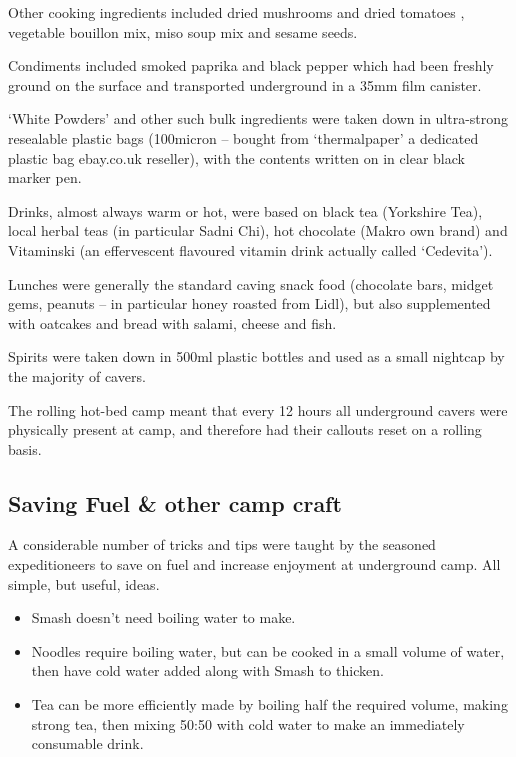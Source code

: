 Other cooking ingredients included dried mushrooms and dried tomatoes ,
vegetable bouillon mix, miso soup mix and sesame seeds.

Condiments included smoked paprika and black pepper which had been
freshly ground on the surface and transported underground in a 35mm film
canister.

`White Powders' and other such bulk ingredients were taken down in
ultra-strong resealable plastic bags (100micron -- bought from
`thermalpaper' a dedicated plastic bag ebay.co.uk reseller), with the
contents written on in clear black marker pen.

Drinks, almost always warm or hot, were based on black tea (Yorkshire
Tea), local herbal teas (in particular Sadni Chi), hot chocolate (Makro
own brand) and Vitaminski (an effervescent flavoured vitamin drink
actually called `Cedevita').

Lunches were generally the standard caving snack food (chocolate bars,
midget gems, peanuts -- in particular honey roasted from Lidl), but also
supplemented with oatcakes and bread with salami, cheese and fish.

Spirits were taken down in 500ml plastic bottles and used as a small
nightcap by the majority of cavers.

The rolling hot-bed camp meant that every 12 hours all underground
cavers were physically present at camp, and therefore had their callouts
reset on a rolling basis.

\hypertarget{saving-fuel-other-camp-craft}{%
\subsection{Saving Fuel \& other camp
craft}\label{saving-fuel-other-camp-craft}}

A considerable number of tricks and tips were taught by the seasoned
expeditioneers to save on fuel and increase enjoyment at underground
camp. All simple, but useful, ideas.

\begin{itemize}
\tightlist
\item
  Smash doesn't need boiling water to make.
\item
  Noodles require boiling water, but can be cooked in a small volume of
  water, then have cold water added along with Smash to thicken.
\item
  Tea can be more efficiently made by boiling half the required volume,
  making strong tea, then mixing 50:50 with cold water to make an
  immediately consumable drink.
\end{itemize}

